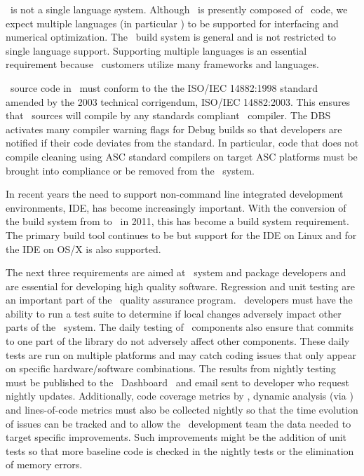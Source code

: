 \draco\ is not a single language system.  Although \draco\ is
presently composed of \cpp\ code, we expect multiple languages
(in particular ) to be supported for interfacing and numerical
optimization.  The \draco\ build system is general and is not
restricted to single language support.  Supporting multiple languages
is an essential requirement because \draco\ customers utilize many
frameworks and languages.

\cpp\ source code in \draco\ must conform to the the ISO/IEC 14882:1998 standard amended by the 2003 technical corrigendum, ISO/IEC 14882:2003.  This ensures that \cpp\ sources will 
compile by any standards compliant \cpp\ compiler.  The DBS activates many compiler warning flags for Debug builds so that developers are notified if their code deviates from the standard.  In particular, code that does not compile cleaning using ASC standard compilers on target ASC platforms must be brought into compliance or be removed from the \draco\ system.

In recent years the need to support non-command line integrated development environments,  IDE, has become increasingly important.  With the conversion of the build system from  to \cmake\ in 2011, this has become a build system requirement.  The primary build tool continues to be  but support for the  IDE on Linux and for the  IDE on OS/X is also supported.

The next three requirements are aimed at \draco\ system and package
developers and are essential for developing high quality software.
Regression and unit testing are an important part of the \draco\ quality assurance program.  \draco\ developers must have the ability to run a test suite to determine if local changes adversely impact other parts of the \draco\ system.  The daily
testing of \draco\ components also ensure that commits to
one part of the library do not adversely affect other components.  These daily tests are run on multiple platforms and may catch coding issues that only appear on specific hardware/software combinations.  The results from nightly testing must be published to the \draco\ Dashboard~\cite{codercdash} and email sent to developer who request nightly updates.  Additionally, code coverage metrics by \bullseye, dynamic analysis (via \valgrind) and lines-of-code metrics must also be collected nightly so that the time evolution of issues can be tracked and to allow the \draco\ development team the data needed to target specific improvements.  Such improvements might be the addition of unit tests so that more baseline code is checked in the nightly tests or the elimination of memory errors.

